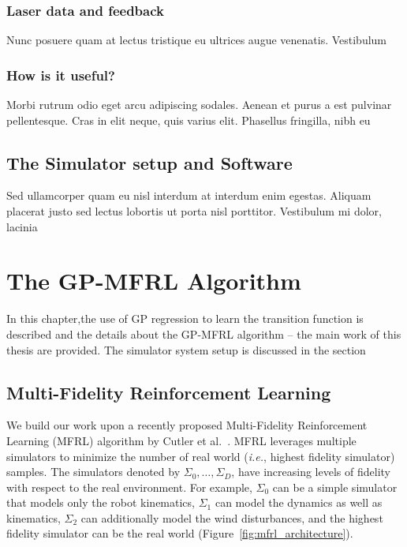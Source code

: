 \documentclass[12pt]{report}
\newcommand{\ie}{\textit{i.e.}}
\begin{document}
\subsection{Laser data and feedback}

Nunc posuere quam at lectus tristique eu ultrices augue venenatis. Vestibulum 


\subsection{How is it useful?}
Morbi rutrum odio eget arcu adipiscing sodales. Aenean et purus a est pulvinar pellentesque. Cras in elit neque, quis varius elit. Phasellus fringilla, nibh eu 


\section{The Simulator setup and Software}

Sed ullamcorper quam eu nisl interdum at interdum enim egestas. Aliquam placerat justo sed lectus lobortis ut porta nisl porttitor. Vestibulum mi dolor, lacinia 




\chapter{The GP-MFRL Algorithm} %
In this chapter,the use of GP regression to learn the transition function is described and the details about the GP-MFRL algorithm -- the main work of this thesis are provided. The simulator system setup is discussed in the section

\label{gpMfrl} %
\section{Multi-Fidelity Reinforcement Learning}
We build our work upon a recently proposed Multi-Fidelity Reinforcement Learning (MFRL) algorithm by Cutler et al.~\cite{cutler2014reinforcement}. MFRL leverages multiple simulators to minimize the number of real world (\ie, highest fidelity simulator) samples. The simulators denoted by $\Sigma_0,\ldots,\Sigma_D$, have increasing levels of fidelity with respect to the real environment. For example, $\Sigma_0$ can be a simple simulator that models only the robot kinematics, $\Sigma_1$ can model the dynamics as well as kinematics, $\Sigma_2$ can additionally model the wind disturbances, and the highest fidelity simulator can be the real world (Figure~\ref{fig:mfrl_architecture}). 
\end{document}
